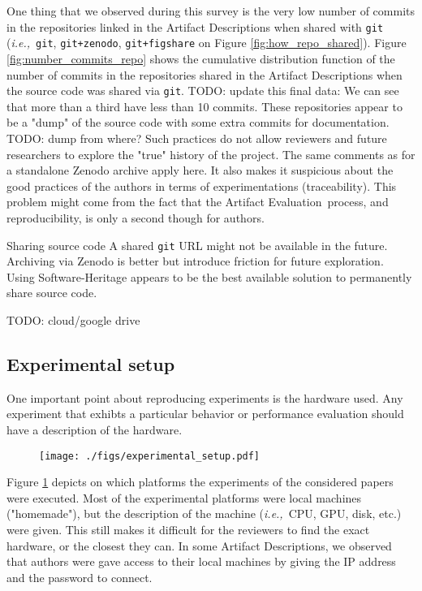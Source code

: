 \documentclass[sigconf,natbib=false]{acmart}
\newcommand{\ie}{\emph{i.e.,}}
\newcommand{\ad}{Artifact Description}
\newcommand{\aeval}{Artifact Evaluation}
\newcommand{\todo}[1]{{\color{red}TODO: #1}}
\begin{document}
One thing that we observed during this survey is the very low number of commits in the repositories linked in the \ad s when shared with \texttt{git} (\ie\ \texttt{git}, \texttt{git+zenodo}, \texttt{git+figshare} on Figure \ref{fig:how_repo_shared}).
Figure \ref{fig:number_commits_repo} shows the cumulative distribution function of the number of commits in the repositories shared in the \ad s when the source code was shared via \texttt{git}.
\todo{update this final data: We can see that more than a third have less than 10 commits.}
These repositories appear to be a "dump" of the source code with some extra commits for documentation.
\todo{dump from where?}
Such practices do not allow reviewers and future researchers to explore the "true" history of the project.
The same comments as for a standalone Zenodo archive apply here.
It also makes it suspicious about the good practices of the authors in terms of experimentations (traceability).
This problem might come from the fact that the \aeval\ process, and reproducibility, is only a second though for authors.

\begin{lesson}{Sharing source code}{}
  A shared \texttt{git} URL might not be available in the future.
  Archiving via Zenodo is better but introduce friction for future exploration.
  Using Software-Heritage appears to be the best available solution to permanently share source code.
\end{lesson}

\todo{cloud/google drive}

\subsection{Experimental setup}\label{sec:sop:expe}

One important point about reproducing experiments is the hardware used.
Any experiment that exhibts a particular behavior or performance evaluation should have a description of the hardware. 

\begin{figure}
  \centering
  \texttt{[image: ./figs/experimental\_setup.pdf]}
  \caption{}\label{fig:experimental_setup}
\end{figure}

Figure \ref{fig:experimental_setup} depicts on which platforms the experiments of the considered papers were executed.
Most of the experimental platforms were local machines ("homemade"), but the description of the machine (\ie\ CPU, GPU, disk, etc.) were given.
This still makes it difficult for the reviewers to find the exact hardware, or the closest they can.
In some \ad s, we observed that authors were gave access to their local machines by giving the IP address and the password to connect.
\end{document}
